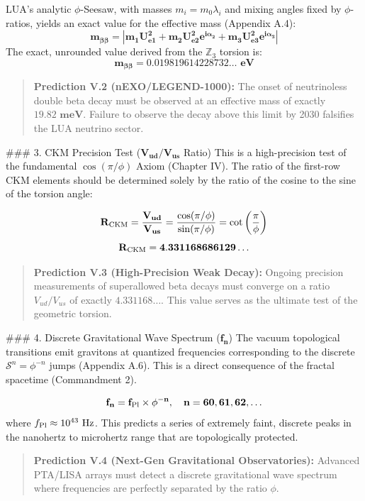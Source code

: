 LUA’s analytic $\phi$-Seesaw, with masses $m_i = m_0 \lambda_i$ and mixing angles fixed by $\phi$-ratios, yields an exact value for the effective mass (Appendix A.4):
$$
\mathbf{m_{\beta\beta} = | m_1 U_{e1}^2 + m_2 U_{e2}^2 e^{i\alpha_2} + m_3 U_{e3}^2 e^{i\alpha_3} |}
$$
The exact, unrounded value derived from the $\mathbb{Z}_3$ torsion is:
$$
\mathbf{m_{\beta\beta} = 0.019819614228732\dots \text{ eV}}
$$
\begin{quote}
\textbf{Prediction V.2 (nEXO/LEGEND-1000):} The onset of neutrinoless double beta decay must be observed at an effective mass of exactly $\mathbf{19.82 \text{ meV}}$. Failure to observe the decay above this limit by 2030 falsifies the LUA neutrino sector.
\end{quote}

### 3. CKM Precision Test ($\mathbf{V_{ud}/V_{us}}$ Ratio)
This is a high-precision test of the fundamental $\cos(\pi/\phi)$ Axiom (Chapter IV). The ratio of the first-row CKM elements should be determined solely by the ratio of the cosine to the sine of the torsion angle:

$$
\mathbf{R_{\rm CKM} = \frac{V_{ud}}{V_{us}} = \frac{\cos(\pi/\phi)}{\sin(\pi/\phi)} = \cot\left(\frac{\pi}{\phi}\right)}
$$
$$
\mathbf{R_{\rm CKM} = 4.331168686129\dots}
$$
\begin{quote}
\textbf{Prediction V.3 (High-Precision Weak Decay):} Ongoing precision measurements of superallowed beta decays must converge on a ratio $V_{ud}/V_{us}$ of exactly $\mathbf{4.331168\dots}$. This value serves as the ultimate test of the geometric torsion.
\end{quote}

### 4. Discrete Gravitational Wave Spectrum ($\mathbf{f_n}$)
The vacuum topological transitions emit gravitons at quantized frequencies corresponding to the discrete $\mathcal{S}^n = \phi^{-n}$ jumps (Appendix A.6). This is a direct consequence of the fractal spacetime (Commandment 2).

$$
\mathbf{f_n = f_{\rm Pl} \times \phi^{-n}, \quad n = 60, 61, 62, \ldots}
$$
where $f_{\rm Pl} \approx 10^{43} \text{ Hz}$. This predicts a series of extremely faint, discrete peaks in the nanohertz to microhertz range that are topologically protected.
\begin{quote}
\textbf{Prediction V.4 (Next-Gen Gravitational Observatories):} Advanced PTA/LISA arrays must detect a discrete gravitational wave spectrum where frequencies are perfectly separated by the ratio $\phi$.
\end{quote}


